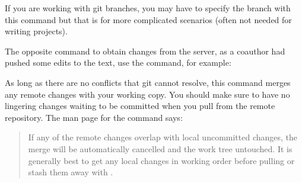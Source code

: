 If you are working with git branches, you may have to specify the branch with this command but that is for more complicated scenarios (often not needed for writing projects).  

The opposite command to obtain changes from the server, as a coauthor had pushed some edits to the text, use the  command, for example:

As long as there are no conflicts that git cannot resolve, this command merges any remote changes with your working copy.  You should make sure to have no lingering changes waiting to be committed when you pull from the remote repository.  The man page for the  command says:
\begin{quote}
If any of the remote changes overlap with local uncommitted changes, the merge will be automatically cancelled and the work tree untouched. It is generally best to get any local changes in working order before pulling or stash them away with .
\end{quote}

